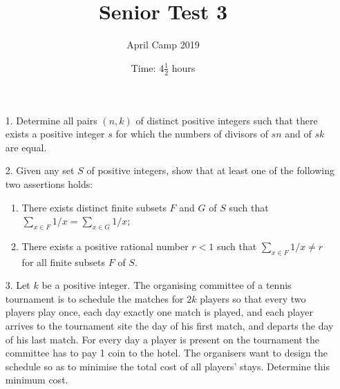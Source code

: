 \documentclass[a4paper, 12pt]{article}
\title{Senior Test 3}
\author{April Camp 2019}
\date{Time: $4 \frac{1}{2}$ hours}
\begin{document}
 \maketitle \vspace{24pt}

\begin{enumerate}

\item[1.]  Determine all pairs $(n, k)$ of distinct positive integers such that there exists a positive integer $s$ for which the numbers of divisors of $sn$ and of $sk$ are equal.

\vspace{24pt}


\item[2.]  Given any set $S$ of positive integers, show that at least one of the following two assertions holds:

\begin{enumerate}
    \item There exists distinct finite subsets $F$ and $G$ of $S$ such that $\sum_{x \in F} 1/x = \sum_{x \in G} 1/x$;
    
    \item There exists a positive rational number $r<1$ such that $\sum_{x \in F} 1/x \not = r$ for all finite subsets $F$ of $S$.
\end{enumerate}

\vspace{24pt}


\item[3.]  Let $k$ be a positive integer. The organising committee of a tennis tournament is to schedule the matches for $2k$ players so that every two players play once, each day exactly one match is played, and each player arrives to the tournament site the day of his first match, and departs the day of his last match. For every day a player is present on the tournament the committee has to pay 1 coin to the hotel. The organisers want to design the schedule so as to minimise the total cost of all players' stays. Determine this minimum cost.


\end{enumerate}

\vfill

\centering

\vspace{12mm}
\end{document}
